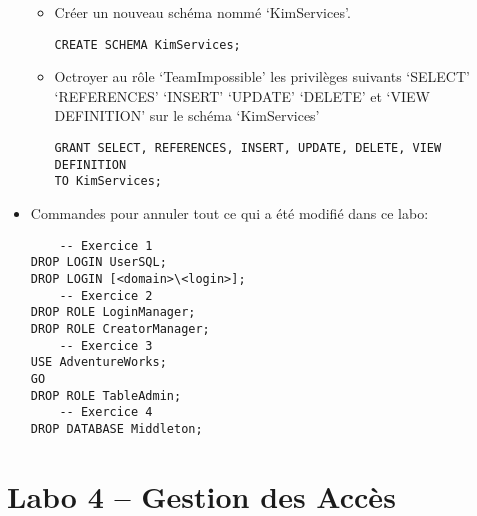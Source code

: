 \documentclass[a4paper]{article}
\begin{document}
\begin{itemize}
\begin{itemize}
\item Créer un nouveau schéma nommé ‘KimServices’.
\begin{example} \begin{verbatim}
CREATE SCHEMA KimServices;
\end{verbatim} \end{example}

\item Octroyer au rôle ‘TeamImpossible’ les privilèges suivants ‘SELECT’ ‘REFERENCES’ ‘INSERT’ ‘UPDATE’ ‘DELETE’ et ‘VIEW DEFINITION’ sur le schéma ‘KimServices’ 
\begin{example} \begin{verbatim}
GRANT SELECT, REFERENCES, INSERT, UPDATE, DELETE, VIEW DEFINITION
TO KimServices;
\end{verbatim} \end{example}

\end{itemize}



\item Commandes pour annuler tout ce qui a été modifié dans ce labo:
\begin{example} \begin{verbatim}
    -- Exercice 1
DROP LOGIN UserSQL;
DROP LOGIN [<domain>\<login>];
    -- Exercice 2
DROP ROLE LoginManager;
DROP ROLE CreatorManager;
    -- Exercice 3
USE AdventureWorks;
GO
DROP ROLE TableAdmin;
    -- Exercice 4
DROP DATABASE Middleton;
\end{verbatim} \end{example}



\end{itemize}















\section{Labo 4 -- Gestion des Accès}
\end{document}
